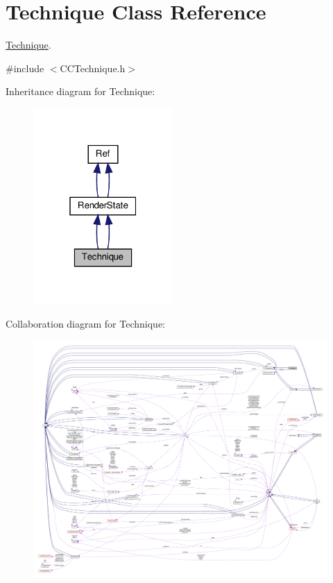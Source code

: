 \hypertarget{classTechnique}{}\section{Technique Class Reference}
\label{classTechnique}


\hyperlink{classTechnique}{Technique}.  




{\ttfamily \#include $<$C\+C\+Technique.\+h$>$}



Inheritance diagram for Technique\+:
\nopagebreak
\begin{figure}[H]
\begin{center}
\leavevmode
\includegraphics[width=151pt]{classTechnique__inherit__graph}
\end{center}
\end{figure}


Collaboration diagram for Technique\+:
\nopagebreak
\begin{figure}[H]
\begin{center}
\leavevmode
\includegraphics[width=350pt]{classTechnique__coll__graph}
\end{center}
\end{figure}
